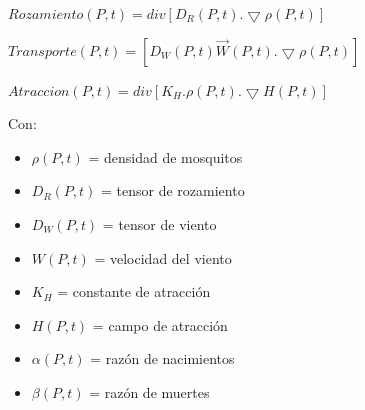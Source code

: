 $Rozamiento(P,t)=div[D_R (P,t) . \bigtriangledown \rho (P,t)]$

$Transporte(P,t)=[D_W (P,t) \vec{W} (P,t) . \bigtriangledown \rho (P,t)]$

$Atraccion(P,t) = div[K_H . \rho (P,t) . \bigtriangledown H (P,t)]$

\singlespacing

Con:

\begin{itemize}
	\item $\rho (P,t)$ = densidad de mosquitos
	\item $D_R (P,t)$ = tensor de rozamiento
	\item $D_W (P,t)$ = tensor de viento
	\item $W (P,t)$ = velocidad del viento
	\item $K_H$ = constante de atracción
	\item $H(P,t)$ = campo de atracción
	\item $\alpha (P,t)$ = razón de nacimientos
	\item $\beta (P,t)$ = razón de muertes
\end{itemize}



